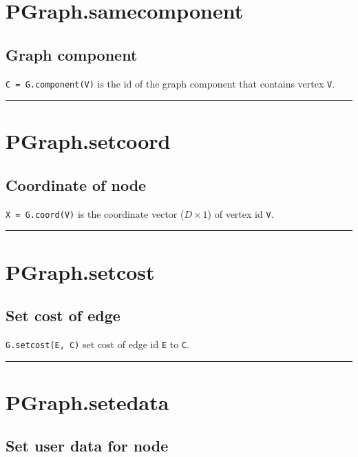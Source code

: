 \hypertarget{PGraph.samecomponent}{\section*{PGraph.samecomponent}}
\subsection*{Graph component}


\texttt{C = G.component(V)} is the id of the graph component that contains vertex
\texttt{V}.

\vspace{1.5ex}\hrule

\hypertarget{PGraph.setcoord}{\section*{PGraph.setcoord}}
\subsection*{Coordinate of node}


\texttt{X = G.coord(V)} is the coordinate vector ($D \times 1$) of vertex id \texttt{V}.

\vspace{1.5ex}\hrule

\hypertarget{PGraph.setcost}{\section*{PGraph.setcost}}
\subsection*{Set cost of edge}


\texttt{G.setcost(E, C)} set cost of edge id \texttt{E} to \texttt{C}.

\vspace{1.5ex}\hrule

\hypertarget{PGraph.setedata}{\section*{PGraph.setedata}}
\subsection*{Set user data for node}


